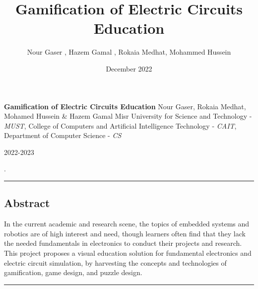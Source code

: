 \documentclass[twoside,a4paper,11pt]{article}
\title{Gamification of Electric
 Circuits Education}
\author{Nour Gaser , Hazem Gamal , Rokaia Medhat, Mohammed Hussein  }
\date{December 2022}
\begin{document}
\begin{center}
\LARGE
\textbf{Gamification of Electric Circuits Education}
\newline
\hfill \break
\large
Nour Gaser, Rokaia Medhat, Mohamed Hussein \& Hazem Gamal
 \newline
\hfill \break
\normalsize
Misr University for Science and Technology -\textit{ MUST}, College of Computers and Artificial Intelligence Technology - \textit{CAIT}, Department of Computer Science - \textit{CS}

\hfill \break
\normalsize
\large 2022-2023   
\end{center}
\pagestyle{fancy}
\setlength{\headheight}{1.5cm}.

\centering
\hrule
\subsection*{Abstract} 
\footnotesize
\centering
In the current academic and research scene, the topics of embedded systems and robotics are of high interest and need, though learners often find that they lack the needed fundamentals in electronics to conduct their projects and research. This project proposes a visual education solution for fundamental electronics and electric circuit simulation, by harvesting the concepts and technologies of gamification, game design, and puzzle design. 

\hfill \break
\hrule
\end{document}
